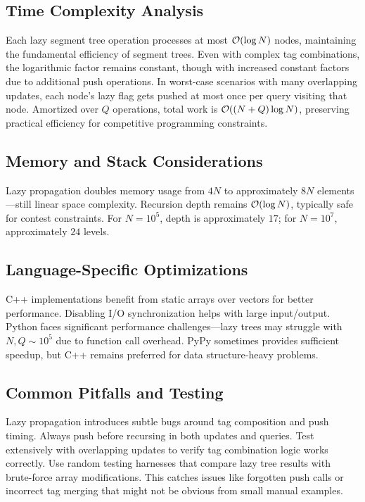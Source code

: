 \subsection{Time Complexity Analysis}
Each lazy segment tree operation processes at most $\mathcal{O}(\log N)$ nodes, maintaining the fundamental efficiency of segment trees. Even with complex tag combinations, the logarithmic factor remains constant, though with increased constant factors due to additional push operations.
In worst-case scenarios with many overlapping updates, each node's lazy flag gets pushed at most once per query visiting that node. Amortized over $Q$ operations, total work is $\mathcal{O}((N + Q) \log N)$, preserving practical efficiency for competitive programming constraints.
\subsection{Memory and Stack Considerations}
Lazy propagation doubles memory usage from $4N$ to approximately $8N$ elements—still linear space complexity. Recursion depth remains $\mathcal{O}(\log N)$, typically safe for contest constraints. For $N = 10^5$, depth is approximately $17$; for $N = 10^7$, approximately $24$ levels.
\subsection{Language-Specific Optimizations}
C++ implementations benefit from static arrays over vectors for better performance. Disabling I/O synchronization helps with large input/output. Python faces significant performance challenges—lazy trees may struggle with $N, Q \sim 10^5$ due to function call overhead. PyPy sometimes provides sufficient speedup, but C++ remains preferred for data structure-heavy problems.

\subsection{Common Pitfalls and Testing}
Lazy propagation introduces subtle bugs around tag composition and push timing. Always push before recursing in both updates and queries. Test extensively with overlapping updates to verify tag combination logic works correctly.
Use random testing harnesses that compare lazy tree results with brute-force array modifications. This catches issues like forgotten push calls or incorrect tag merging that might not be obvious from small manual examples.
